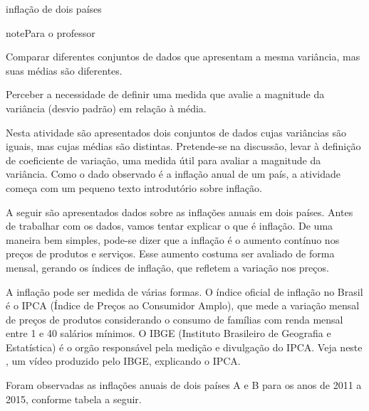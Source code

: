 \begin{task}{inflação de dois países}

\begin{sphinxadmonition}{note}{Para o professor}


Comparar diferentes conjuntos de dados que apresentam a mesma variância, mas suas médias são diferentes.

Perceber a necessidade de definir uma medida que avalie a magnitude da variância (desvio padrão) em relação à média.

 Nesta atividade são apresentados dois conjuntos de dados cujas variâncias são iguais, mas cujas médias são distintas. Pretende-se na discussão, levar à definição de coeficiente de variação, uma medida útil para avaliar a magnitude da variância. Como o dado observado é a inflação anual de um país, a atividade começa com um pequeno texto introdutório sobre inflação.
\end{sphinxadmonition}

A seguir são apresentados dados sobre as inflações anuais em dois países. Antes de trabalhar com os dados, vamos tentar explicar o que é inflação. De uma maneira bem simples, pode-se dizer que a inflação é o aumento contínuo nos preços de produtos e serviços. Esse aumento costuma ser avaliado de forma mensal, gerando os índices de inflação, que refletem a variação nos preços.

A inflação pode ser medida de várias formas. O índice oficial de inflação no Brasil é o IPCA (Índice de Preços ao Consumidor Amplo), que mede a variação mensal de preços de produtos considerando o consumo de famílias com renda mensal entre 1 e 40 salários mínimos. O IBGE (Instituto Brasileiro de Geografia e Estatística) é o orgão responsável pela medição e divulgação do IPCA. Veja neste
, um vídeo produzido pelo IBGE, explicando o IPCA.

Foram observadas as inflações anuais de dois países A e B para os anos de 2011 a 2015, conforme tabela a seguir.


\begin{savenotes}\sphinxattablestart
\centering
{}
\label{\detokenize{PE104-4:id9}}
\sphinxaftercaption
\begin{tabulary}{\linewidth}[t]{|T|T|T|T|T|T|T|}
\hline


\end{tabulary}
\end{savenotes}
\end{task}

